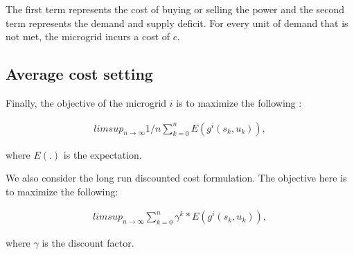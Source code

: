 The first term represents the cost of buying or selling the power and the second term represents the demand and supply deficit. For every unit of demand that is not met, the microgrid incurs a cost of $c$. 

\subsection{Average cost setting}
Finally, the objective of the microgrid $i$ is to maximize the following \cite{avgcost}:

\begin{align}
limsup_{n \rightarrow \infty} 1/n \sum_{k = 0}^{n} E(g^{i}(s_{k},u_{k})),
\end{align}

where $E(.)$ is the expectation. 

We also consider the long run discounted cost formulation. The objective here is to maximize the following:

\begin{align}
limsup_{n \rightarrow \infty} \sum_{k = 0}^{n} \gamma^{k} * E(g^{i}(s_{k},u_{k})),
\end{align}

where $\gamma$ is the discount factor. 

